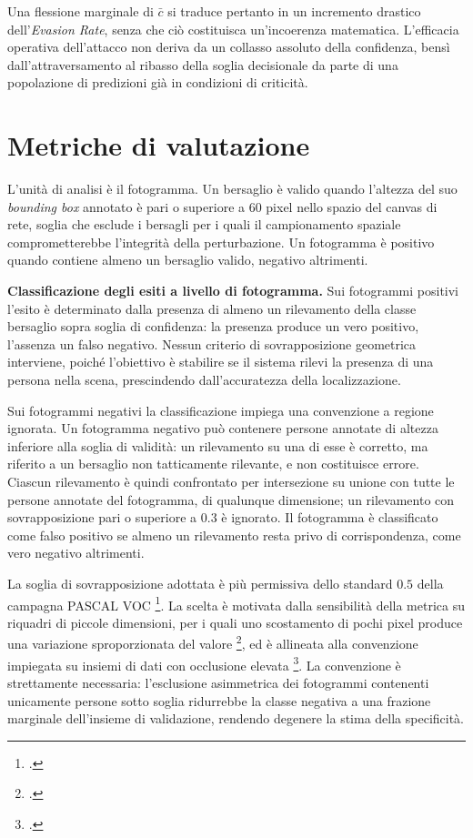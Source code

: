 \documentclass[a4paper,12pt]{report}
\begin{document}
Una flessione marginale di $\bar{c}$ si traduce pertanto in un incremento
drastico dell'\textit{Evasion Rate}, senza che ciò costituisca un'incoerenza
matematica. L'efficacia operativa dell'attacco non deriva da un collasso
assoluto della confidenza, bensì dall'attraversamento al ribasso della soglia
decisionale da parte di una popolazione di predizioni già in condizioni di
criticità.

\section{Metriche di valutazione}
\label{sec:metriche}

L'unità di analisi è il fotogramma. Un bersaglio è valido quando l'altezza del
suo \textit{bounding box} annotato è pari o superiore a $60$ pixel nello spazio
del canvas di rete, soglia che esclude i bersagli per i quali il campionamento
spaziale comprometterebbe l'integrità della perturbazione. Un fotogramma è
positivo quando contiene almeno un bersaglio valido, negativo altrimenti.

\textbf{Classificazione degli esiti a livello di fotogramma.}
\label{sec:esiti}
Sui fotogrammi positivi l'esito è determinato dalla presenza di almeno un
rilevamento della classe bersaglio sopra soglia di confidenza: la presenza
produce un vero positivo, l'assenza un falso negativo. Nessun criterio di
sovrapposizione geometrica interviene, poiché l'obiettivo è stabilire se il
sistema rilevi la presenza di una persona nella scena, prescindendo
dall'accuratezza della localizzazione.

Sui fotogrammi negativi la classificazione impiega una convenzione a regione
ignorata. Un fotogramma negativo può contenere persone annotate di altezza
inferiore alla soglia di validità: un rilevamento su una di esse è corretto, ma
riferito a un bersaglio non tatticamente rilevante, e non costituisce errore.
Ciascun rilevamento è quindi confrontato per intersezione su unione con tutte le
persone annotate del fotogramma, di qualunque dimensione; un rilevamento con
sovrapposizione pari o superiore a $0.3$ è ignorato. Il fotogramma è classificato
come falso positivo se almeno un rilevamento resta privo di corrispondenza, come
vero negativo altrimenti.

La soglia di sovrapposizione adottata è più permissiva dello standard $0.5$
della campagna PASCAL VOC \footcite{everingham_2010_voc}. La scelta è motivata
dalla sensibilità della metrica su riquadri di piccole dimensioni, per i quali
uno scostamento di pochi pixel produce una variazione sproporzionata del valore
\footcite{yu_2020_scalematch}, ed è allineata alla convenzione impiegata su
insiemi di dati con occlusione elevata \footcite{shao_2018_crowdhuman}. La
convenzione è strettamente necessaria: l'esclusione asimmetrica dei fotogrammi
contenenti unicamente persone sotto soglia ridurrebbe la classe negativa a una
frazione marginale dell'insieme di validazione, rendendo degenere la stima della
specificità.
\end{document}
